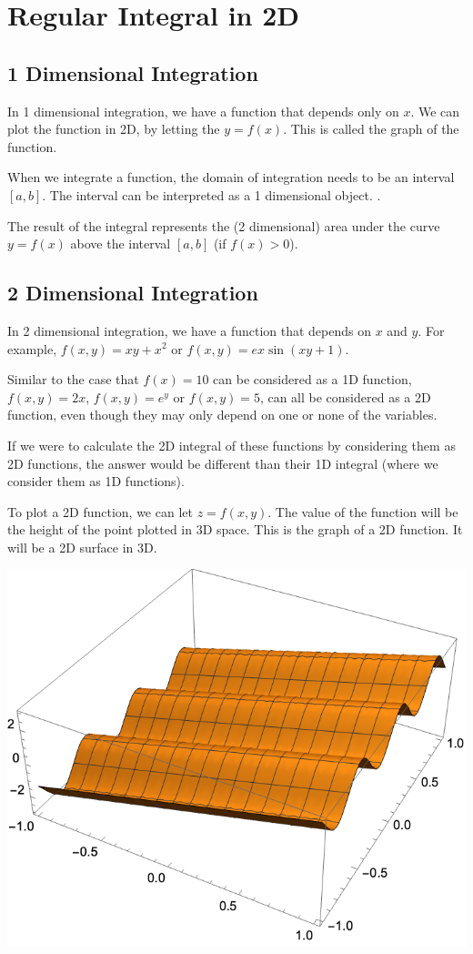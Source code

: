 \section{Regular Integral in 2D}

\subsection*{1 Dimensional Integration}

In 1 dimensional integration, we have a function that depends only on $x$. We can plot the function in 2D, by letting the $y = f(x)$. This is called the graph of the function.

When we integrate a function, the domain of integration needs to be an interval $[a, b]$. The interval can be interpreted as a 1 dimensional object. .

The result of the integral represents the (2 dimensional) area under the curve $y = f(x)$ above the interval $[a, b]$ (if $f(x) > 0$).

\subsection*{2 Dimensional Integration}

In 2 dimensional integration, we have a function that depends on $x$ and $y$. For example, $f(x, y) = xy + x^2$ or $f(x, y) = e x \sin(xy + 1)$. 

Similar to the case that $f(x) = 10$ can be considered as a 1D function, $f(x, y) = 2x$, $f(x, y) = e^y$ or $f(x, y) = 5$, can all be considered as a 2D function, even though they may only depend on one or none of the variables.

If we were to calculate the 2D integral of these functions by considering them as 2D functions, the answer would be different than their 1D integral (where we consider them as 1D functions).

To plot a 2D function, we can let $z = f(x, y)$. The value of the function will be the height of the point plotted in 3D space. This is the graph of a 2D function. It will be a 2D surface in 3D.

\begin{center} \includegraphics[width=0.275\linewidth]{Plots/s_4_1/sin(y)+2x.png} \end{center}

